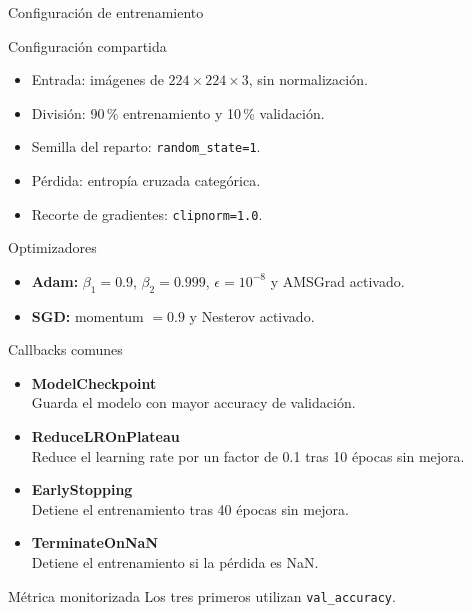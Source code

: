 \documentclass{beamer}
\begin{document}
\begin{frame}{Configuración de entrenamiento}
    \small

    \begin{block}{Configuración compartida}
        \begin{itemize}
            \item Entrada: imágenes de $224 \times 224 \times 3$,
                  sin normalización.
            \item División: 90\,\% entrenamiento y 10\,\% validación.
            \item Semilla del reparto: \texttt{random\_state=1}.
            \item Pérdida: entropía cruzada categórica.
            \item Recorte de gradientes: \texttt{clipnorm=1.0}.
        \end{itemize}
    \end{block}

    \begin{block}{Optimizadores}
        \begin{itemize}
            \item \textbf{Adam:}
                  $\beta_1=0.9$, $\beta_2=0.999$,
                  $\epsilon=10^{-8}$ y AMSGrad activado.
            \item \textbf{SGD:}
                  momentum $=0.9$ y Nesterov activado.
        \end{itemize}
    \end{block}
\end{frame}

\begin{frame}{Callbacks comunes}
    \small

    \begin{itemize}
        \item \textbf{ModelCheckpoint}\\
              Guarda el modelo con mayor accuracy de validación.

        \medskip
        \item \textbf{ReduceLROnPlateau}\\
              Reduce el learning rate por un factor de 0.1
              tras 10 épocas sin mejora.

        \medskip
        \item \textbf{EarlyStopping}\\
              Detiene el entrenamiento tras 40 épocas sin mejora.

        \medskip
        \item \textbf{TerminateOnNaN}\\
              Detiene el entrenamiento si la pérdida es NaN.
    \end{itemize}

    \medskip
    \begin{block}{Métrica monitorizada}
        Los tres primeros utilizan \texttt{val\_accuracy}.
    \end{block}
\end{frame}
\end{document}

